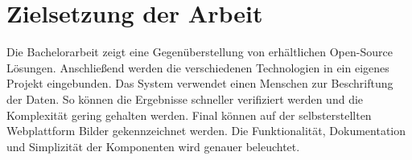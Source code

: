 \section{Zielsetzung der Arbeit}\label{sec:zielsetzung}
Die Bachelorarbeit zeigt eine Gegenüberstellung von erhältlichen Open-Source Lösungen. Anschließend werden die verschiedenen Technologien in ein eigenes Projekt eingebunden. Das System verwendet einen Menschen zur Beschriftung der Daten. So können die Ergebnisse schneller verifiziert werden und die Komplexität gering gehalten werden. Final können auf der selbsterstellten Webplattform Bilder gekennzeichnet werden. Die Funktionalität, Dokumentation und Simplizität der Komponenten wird genauer beleuchtet.
